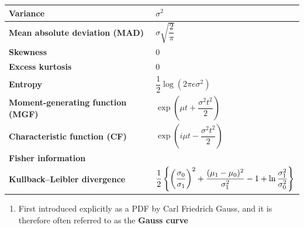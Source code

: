 \begin{longtable}{|m{6cm}|p{9cm}|}
    \textbf{Variance} &
    $\sigma^2$
    \\ \hline

    \textbf{Mean absolute deviation (MAD)} &
    ${\displaystyle \sigma {\sqrt {\dfrac{2}{\pi} }}}$ 
    \\[1ex] \hline

    \textbf{Skewness} &
    $0$ 
    \\ \hline

    \textbf{Excess kurtosis} &
    $0$ 
    \\ \hline

    \textbf{Entropy} &
    ${\displaystyle {\dfrac {1}{2}}\log(2\pi e\sigma ^{2})}$
    \\[1ex] \hline

    \textbf{Moment-generating function (MGF)} &
    ${\displaystyle \exp(\mu t+\dfrac{\sigma ^{2}t^{2}}{2})}$
    \\[1ex] \hline

    \textbf{Characteristic function (CF)} &
    ${\displaystyle \exp(i\mu t-\dfrac{\sigma ^{2}t^{2}}{2})}$
    \\[1ex] \hline

    \textbf{Fisher information} &
    \tableenumerate{
        \item ${\displaystyle {\mathcal {I}}(\mu ,\sigma )={\begin{pmatrix}1/\sigma ^{2}&0\\0&2/\sigma ^{2}\end{pmatrix}}}$
        \vspace{0.1cm}

        \item ${\displaystyle {\mathcal {I}}(\mu ,\sigma ^{2})={\begin{pmatrix}1/\sigma ^{2}&0\\0&1/(2\sigma ^{4})\end{pmatrix}}}$
        \vspace{0.1cm}
    }
    \\[1ex] \hline

    \textbf{Kullback–Leibler divergence} &
    ${\displaystyle {1 \over 2}\left\{\left({\frac {\sigma _{0}}{\sigma _{1}}}\right)^{2}+{\frac {(\mu _{1}-\mu _{0})^{2}}{\sigma _{1}^{2}}}-1+\ln {\sigma _{1}^{2} \over \sigma _{0}^{2}}\right\}}$
    \\[2ex] \hline

\end{longtable}
\renewcommand{\arraystretch}{1}


\begin{enumerate}
    \item First introduced explicitly as a PDF by Carl Friedrich Gauss, and it is therefore often referred to as the \textbf{Gauss curve} 
\end{enumerate}

